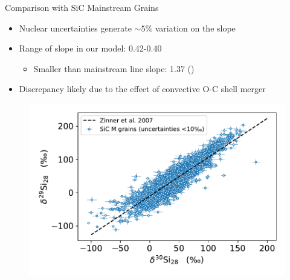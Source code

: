 \documentclass[10pt]{beamer}
\begin{document}
\begin{frame}{Comparison with SiC Mainstream Grains}
        \begin{minipage}{5.5cm}
        \begin{itemize}
            \item \alert{Nuclear uncertainties generate $\sim 5\%$ variation on the slope}

            \item Range of slope in our model: 0.42-0.40
            \begin{itemize}
                \item Smaller than mainstream line slope: 1.37 (\citealt{Zinner2007})
            \end{itemize}

            \item Discrepancy likely due to the effect of convective O-C shell merger
        
        \end{itemize}
    \end{minipage}
    \begin{minipage}{5.8cm}
    \centering
        \begin{figure}
            \centering
            \includegraphics[width = \textwidth]{figs/stardust.pdf}
        \end{figure}
    \end{minipage}
\end{frame}
\end{document}
